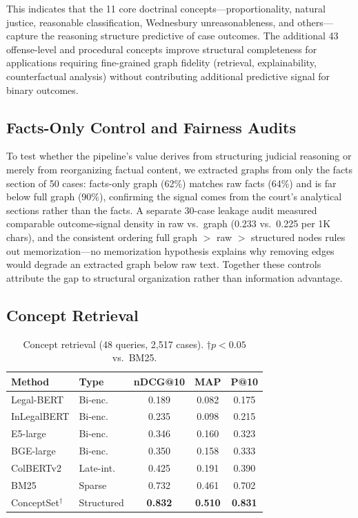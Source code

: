 \documentclass[11pt]{article}
\begin{document}
This indicates that the 11 core doctrinal concepts---proportionality, natural justice, reasonable classification, Wednesbury unreasonableness, and others---capture the reasoning structure predictive of case outcomes. The additional 43 offense-level and procedural concepts improve structural completeness for applications requiring fine-grained graph fidelity (retrieval, explainability, counterfactual analysis) without contributing additional predictive signal for binary outcomes.

\subsection{Facts-Only Control and Fairness Audits}

To test whether the pipeline's value derives from structuring judicial reasoning or merely from reorganizing factual content, we extracted graphs from only the facts section of 50 cases: facts-only graph (62\%) matches raw facts (64\%) and is far below full graph (90\%), confirming the signal comes from the court's analytical sections rather than the facts. A separate 30-case leakage audit measured comparable outcome-signal density in raw vs.\ graph (0.233 vs.\ 0.225 per 1K chars), and the consistent ordering full graph $>$ raw $>$ structured nodes rules out memorization---no memorization hypothesis explains why removing edges would degrade an extracted graph below raw text. Together these controls attribute the gap to structural organization rather than information advantage.

\subsection{Concept Retrieval}

\begin{table}[t]
\small
\centering
\caption{Concept retrieval (48 queries, 2,517 cases). $\dagger p < 0.05$ vs.\ BM25.}
\label{tab:retrieval}
\begin{tabular}{llccc}
\toprule
Method & Type & nDCG@10 & MAP & P@10 \\
\midrule
Legal-BERT & Bi-enc. & 0.189 & 0.082 & 0.175 \\
InLegalBERT & Bi-enc. & 0.235 & 0.098 & 0.215 \\
E5-large & Bi-enc. & 0.346 & 0.160 & 0.323 \\
BGE-large & Bi-enc. & 0.350 & 0.158 & 0.333 \\
ColBERTv2 & Late-int. & 0.425 & 0.191 & 0.390 \\
BM25 & Sparse & 0.732 & 0.461 & 0.702 \\
ConceptSet$^\dagger$ & Structured & \textbf{0.832} & \textbf{0.510} & \textbf{0.831} \\
\bottomrule
\end{tabular}
\end{table}
\end{document}
